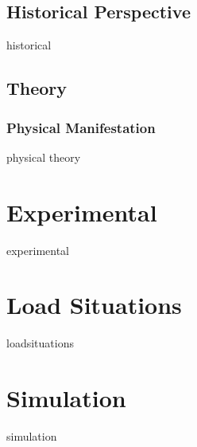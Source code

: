 \documentclass[a4paper,titlepage,onecolumn]{report}
\begin{document}
	\section{Historical Perspective}
	{historical}
	\section{Theory}
	\subsection{Physical Manifestation}
	{physical}
	{theory}
\chapter{Experimental} \label{ch:qcmexperimental}
{experimental}
\chapter{Load Situations} \label{ch:qcmloadsituations}
{loadsituations}
\chapter{Simulation} \label{ch:qcmsimulation}
{simulation}

\appendix



\end{document}
